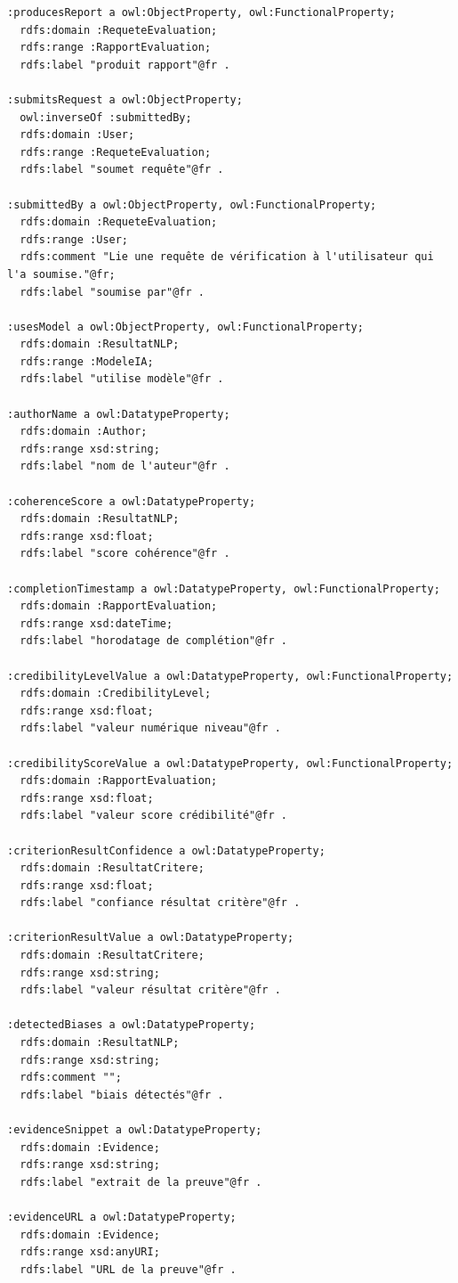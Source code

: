 \documentclass[9pt,twocolumn,twoside,french]{article}
\begin{document}
\begin{lstlisting}[language=Turtle,basicstyle=\ttfamily\tiny,frame=single]
:producesReport a owl:ObjectProperty, owl:FunctionalProperty;
  rdfs:domain :RequeteEvaluation;
  rdfs:range :RapportEvaluation;
  rdfs:label "produit rapport"@fr .

:submitsRequest a owl:ObjectProperty;
  owl:inverseOf :submittedBy;
  rdfs:domain :User;
  rdfs:range :RequeteEvaluation;
  rdfs:label "soumet requête"@fr .

:submittedBy a owl:ObjectProperty, owl:FunctionalProperty;
  rdfs:domain :RequeteEvaluation;
  rdfs:range :User;
  rdfs:comment "Lie une requête de vérification à l'utilisateur qui l'a soumise."@fr;
  rdfs:label "soumise par"@fr .

:usesModel a owl:ObjectProperty, owl:FunctionalProperty;
  rdfs:domain :ResultatNLP;
  rdfs:range :ModeleIA;
  rdfs:label "utilise modèle"@fr .

:authorName a owl:DatatypeProperty;
  rdfs:domain :Author;
  rdfs:range xsd:string;
  rdfs:label "nom de l'auteur"@fr .

:coherenceScore a owl:DatatypeProperty;
  rdfs:domain :ResultatNLP;
  rdfs:range xsd:float;
  rdfs:label "score cohérence"@fr .

:completionTimestamp a owl:DatatypeProperty, owl:FunctionalProperty;
  rdfs:domain :RapportEvaluation;
  rdfs:range xsd:dateTime;
  rdfs:label "horodatage de complétion"@fr .

:credibilityLevelValue a owl:DatatypeProperty, owl:FunctionalProperty;
  rdfs:domain :CredibilityLevel;
  rdfs:range xsd:float;
  rdfs:label "valeur numérique niveau"@fr .

:credibilityScoreValue a owl:DatatypeProperty, owl:FunctionalProperty;
  rdfs:domain :RapportEvaluation;
  rdfs:range xsd:float;
  rdfs:label "valeur score crédibilité"@fr .

:criterionResultConfidence a owl:DatatypeProperty;
  rdfs:domain :ResultatCritere;
  rdfs:range xsd:float;
  rdfs:label "confiance résultat critère"@fr .

:criterionResultValue a owl:DatatypeProperty;
  rdfs:domain :ResultatCritere;
  rdfs:range xsd:string;
  rdfs:label "valeur résultat critère"@fr .

:detectedBiases a owl:DatatypeProperty;
  rdfs:domain :ResultatNLP;
  rdfs:range xsd:string;
  rdfs:comment "";
  rdfs:label "biais détectés"@fr .

:evidenceSnippet a owl:DatatypeProperty;
  rdfs:domain :Evidence;
  rdfs:range xsd:string;
  rdfs:label "extrait de la preuve"@fr .

:evidenceURL a owl:DatatypeProperty;
  rdfs:domain :Evidence;
  rdfs:range xsd:anyURI;
  rdfs:label "URL de la preuve"@fr .


\end{lstlisting}
\end{document}
